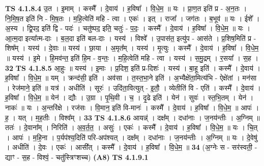 \documentclass[17pt]{extarticle}
\begin{document}
                  \newline
                                \textbf{ TS 4.1.8.4} \newline
                  उ॒त । इ॒माम् । कस्मै᳚ । दे॒वाय॑ । ह॒विषा᳚ । वि॒धे॒म॒ ॥ यः । प्रा॒ण॒त इति॑ प्र - अ॒न॒तः । नि॒मि॒ष॒त इति॑ नि - मि॒ष॒तः । म॒हि॒त्वेति॑ महि - त्वा । एकः॑ । इत् । राजा᳚ । जग॑तः । ब॒भूव॑ ॥ यः । ईशे᳚ । अ॒स्य । द्वि॒पद॒ इति॑ द्वि - पदः॑ । चतु॑ष्पद॒ इति॒ चतुः॑ - प॒दः॒ । कस्मै᳚ । दे॒वाय॑ । ह॒विषा᳚ । वि॒धे॒म॒ ॥ यः । आ॒त्म॒दा इत्या᳚त्म-दाः । ब॒ल॒दा इति॑ बल-दाः । यस्य॑ । विश्वे᳚ । उ॒पास॑त॒ इत्यु॑प - आस॑ते । प्र॒शिष॒मिति॑ प्र - शिष᳚म् । यस्य॑ । दे॒वाः ॥ यस्य॑ । छा॒या । अ॒मृत᳚म् । यस्य॑ । मृ॒त्युः । कस्मै᳚ । दे॒वाय॑ । ह॒विषा᳚ । वि॒धे॒म॒ ॥ यस्य॑ । इ॒मे । हि॒मव॑न्त॒ इति॑ हि॒म - व॒न्तः॒ । म॒हि॒त्वेति॑ महि - त्वा । यस्य॑ । स॒मु॒द्रम् । र॒सया᳚ । स॒ह । \textbf{  32} \newline
                  \newline
                                \textbf{ TS 4.1.8.5} \newline
                  आ॒हुः ॥ यस्य॑ । इ॒माः । प्र॒दिश॒ इति॑ प्र-दिशः॑ । यस्य॑ । बा॒हू इति॑ । कस्मै᳚ । दे॒वाय॑ । ह॒विषा᳚ । वि॒धे॒म॒ ॥ यम् । क्रन्द॑सी॒ इति॑ । अव॑सा । त॒स्त॒भा॒ने इति॑ । अ॒भ्यैक्षे॑ता॒मित्य॑भि - ऐक्षे॑तां । मन॑सा । रेज॑माने॒ इति॑ ॥ यत्र॑ । अधीति॑ । सूरः॑ । उदि॑ता॒वित्युत् - इ॒तौ॒ । व्येतीति॑ वि - एति॑ । कस्मै᳚ । दे॒वाय॑ । ह॒विषा᳚ । वि॒धे॒म॒ ॥ येन॑ । द्यौः । उ॒ग्रा । पृ॒थि॒वी । च॒ । दृ॒ढे इति॑ । येन॑ । सुवः॑ । स्त॒भि॒तम् । येन॑ । नाकः॑ ॥ यः । अ॒न्तरि॑क्षे । रज॑सः । वि॒मान॒ इति॑ वि-मानः॑ । कस्मै᳚ । दे॒वाय॑ । ह॒विषा᳚ । वि॒धे॒म॒ ॥ आपः॑ । ह॒ । यत् । म॒ह॒तीः । विश्व᳚म् । \textbf{  33} \newline
                  \newline
                                \textbf{ TS 4.1.8.6} \newline
                  आयन्न्॑ । दक्ष᳚म् । दधा॑नाः । ज॒नय॑न्तीः । अ॒ग्निम् ॥ ततः॑ । दे॒वाना᳚म् । निरिति॑ । अ॒व॒र्त॒त॒ । असुः॑ । एकः॑ । कस्मै᳚ । दे॒वाय॑ । ह॒विषा᳚ । वि॒धे॒म॒ ॥ यः । चि॒त् । आपः॑ । म॒हि॒ना । प॒र्यप॑श्य॒दिति॑ परि-अप॑श्यत् । दक्ष᳚म् । दधा॑नाः । ज॒नय॑न्तीः । अ॒ग्निम् ॥ यः । दे॒वेषु॑ । अधीति॑ । दे॒वः । एकः॑ । आसी᳚त् । कस्मै᳚ । दे॒वाय॑ । ह॒विषा᳚ । वि॒धे॒म॒ ॥ \textbf{  34} \newline
                  \newline
                      (अ॒ग्नेः स - सर॑स्वती॒ - द्याꣳ - स॒ह - विश्वं॒ - चतु॑स्त्रिꣳशच्च)  \textbf{(A8)} \newline \newline
                                \textbf{ TS 4.1.9.1} \newline
\end{document}
